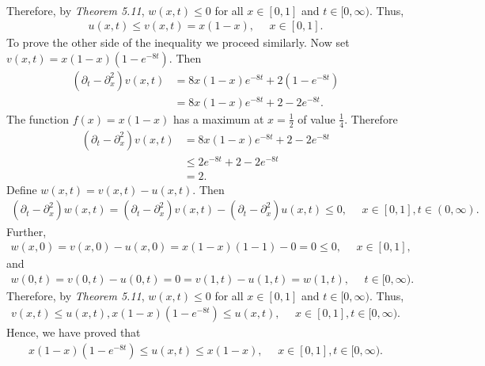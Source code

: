 \begin{questions}
\begin{solution}
\begin{align*}
\end{align*}
Therefore, by \textsl{Theorem 5.11}, $w(x,t)\leq 0$ for all $x\in[0,1]$ and $t\in[0,\infty)$. Thus,
\begin{align*}
u(x,t)\leq v(x,t)=x(1-x),~~~~~~x\in[0,1].
\end{align*}
To prove the other side of the inequality we proceed similarly. Now set $v(x,t)=x(1-x)\left(1-e^{-8t}\right)$. Then
\begin{align*}
(\partial_t-\partial_x^2)v(x,t)&=8x(1-x)e^{-8t}+2\left(1-e^{-8t}\right)\\
&=8x(1-x)e^{-8t}+2-2e^{-8t}.
\end{align*}
The function $f(x)=x(1-x)$ has a maximum at $x=\frac{1}{2}$ of value $\frac{1}{4}$. Therefore
\begin{align*}
(\partial_t-\partial_x^2)v(x,t)&=8x(1-x)e^{-8t}+2-2e^{-8t}\\
&\leq 2e^{-8t}+2-2e^{-8t}\\
&=2.
\end{align*}
Define $w(x,t)=v(x,t)-u(x,t)$. Then
\begin{align*}
(\partial_t-\partial_x^2)w(x,t)=(\partial_t-\partial_x^2)v(x,t)-(\partial_t-\partial_x^2)u(x,t)\leq 0,~~~~~~x\in[0,1],t\in(0,\infty).
\end{align*}
Further,
\begin{align*}
w(x,0)=v(x,0)-u(x,0)=x(1-x)(1-1)-0=0\leq 0,~~~~~~x\in[0,1],
\end{align*}
and
\begin{align*}
w(0,t)=v(0,t)-u(0,t)=0=v(1,t)-u(1,t)=w(1,t),~~~~~~t\in[0,\infty).
\end{align*}
Therefore, by \textsl{Theorem 5.11}, $w(x,t)\leq 0$ for all $x\in[0,1]$ and $t\in[0,\infty)$. Thus,
\begin{align*}
v(x,t)\leq u(x,t),
x(1-x)\left(1-e^{-8t}\right)\leq u(x,t),~~~~~~x\in[0,1],t\in[0,\infty).
\end{align*}
Hence, we have proved that
\begin{align*}
x(1-x)\left(1-e^{-8t}\right)\leq u(x,t)\leq x(1-x),~~~~~~x\in[0,1],t\in[0,\infty).
\end{align*}
\end{solution}
\end{questions}